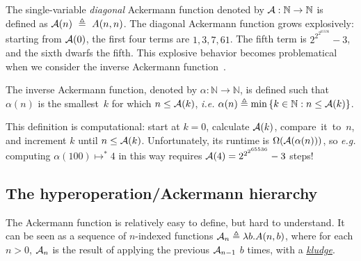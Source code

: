 The single-variable \emph{diagonal} Ackermann function denoted by $\mathcal{A} : \mathbb{N} \to \mathbb{N}$ is defined as $\mathcal{A}(n)~\triangleq~A(n, n)$.  
The diagonal Ackermann function grows explosively: starting from $\mathcal{A}(0)$, the first four terms are $1, 3, 7, 61$.  The fifth term is $2^{2^{2^{65536}}}-3$, and the sixth dwarfs the fifth.
This explosive behavior becomes problematical when we consider
the inverse Ackermann function~\cite{chazelle,tarjan}.
\begin{defn} \label{defn: inv_ack}
The inverse Ackermann function, denoted by $\alpha: \mathbb{N}\to \mathbb{N}$, is defined such that $\alpha(n)$ is the smallest~$k$ for
which $n \le \mathcal{A}(k)$, \emph{i.e.} $\alpha(n) \triangleq \min\left\{k\in \mathbb{N} : n \le \mathcal{A}(k)\right\}$.
\end{defn}
This definition is computational: start at $k=0$, calculate $\mathcal{A}(k)$,
compare~it~to~$n$, and increment $k$ until $n \le \mathcal{A}(k)$.
Unfortunately, its runtime is $\Omega(\mathcal{A}(\alpha(n)))$,
so \emph{e.g.} computing $\alpha(100) \mapsto^{*} 4$ in this way requires
$\mathcal{A}(4) = 2^{2^{2^{65536}}}-3$ steps!

\subsection{The hyperoperation/Ackermann hierarchy}

The Ackermann function is relatively easy to define, but hard to
understand.  It can be seen as
a sequence of $n$-indexed functions $\mathcal{A}_n \triangleq \lambda b.A(n,b)$, where for each $n>0$, $\mathcal{A}_n$ is the result of applying the previous $\mathcal{A}_{n-1}$ $b$ times, with a 
\href{https://github.com/inv-ack/inv-ack/blob/7270e64a2600b771f2b1b1b151f7d13fb2ae6c97/repeater.v#L161-L177}{\color{blue}\emph{kludge}}. %

